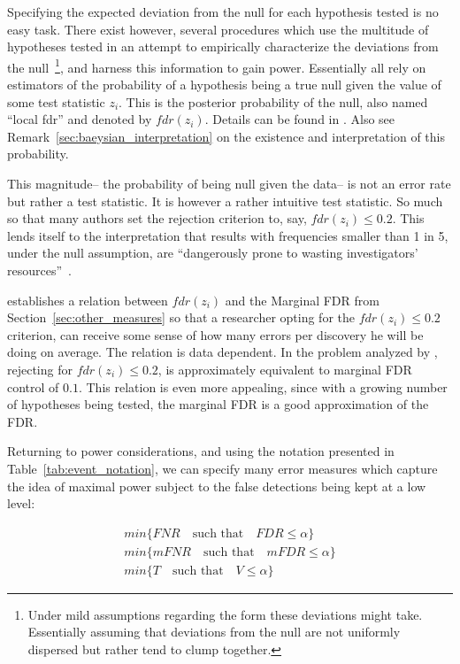 \documentclass[review,12pt]{article}
\theoremstyle{definition}
\theoremstyle{definition}
\begin{document}
Specifying the expected deviation from the null for each hypothesis tested is no easy task. There exist however, several procedures which use the multitude of hypotheses tested in an attempt to empirically characterize the deviations from the null~\footnote{ Under mild assumptions regarding the form these deviations might take. Essentially assuming that deviations from the null are not uniformly dispersed but rather tend to clump together.}, and harness this information to gain power. 
Essentially all rely on estimators of the probability of a hypothesis being a true null given the value of some test statistic $z_i$. This is the posterior probability of the null, also named ``local fdr'' and denoted by $fdr(z_i)$. Details can be found in \cite{efron_microarrays_2008}. Also see Remark~\ref{sec:baeysian_interpretation} on the existence and interpretation of this probability.


This magnitude-- the probability of being null given the data-- is not an error rate but rather a test statistic. It is however a rather intuitive test statistic. So much so that many authors set the rejection criterion to, say, $fdr(z_i)\leq 0.2$. This lends itself to the interpretation that results with frequencies smaller than 1 in 5, under the null assumption, are ``dangerously prone to wasting investigators' resources''~\cite{efron_microarrays_2008}. 


\citet{storey_positive_2003} establishes a relation between $fdr(z_i)$ and the Marginal FDR from Section~\ref{sec:other_measures} so that a researcher opting for the $fdr(z_i)\leq 0.2$ criterion, can receive some sense of how many errors per discovery he will be doing on average.  The relation is data dependent. In the problem analyzed by \citet{efron_microarrays_2008}, rejecting for $fdr(z_i)\leq 0.2$, is approximately equivalent to marginal FDR control of $0.1$.
This relation is even more appealing, since with a growing number of hypotheses being tested, the marginal FDR is a good approximation of the FDR. 

Returning to power considerations, and using the notation presented in Table~\ref{tab:event_notation}, we can specify many error measures which capture the idea of maximal power subject to the false detections being kept at a low level:

\begin{align}
        min\{FNR \quad \text{such that} \quad FDR\leq \alpha \} \label{eq:compound_1}\\
	min\{mFNR \quad \text{such that} \quad mFDR\leq \alpha \} \label{eq:compound_2}\\
	min\{T \quad \text{such that} \quad V \leq \alpha \} \label{eq:compound_3}
\end{align}
\end{document}
